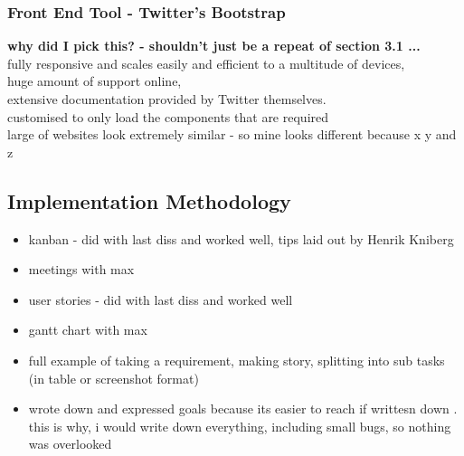\subsubsection{Front End Tool - Twitter's Bootstrap}
{\color{red} 
	\textbf{why did I pick this? - shouldn't just be a repeat of section 3.1 ...}\\
fully responsive and scales easily and efficient to a multitude of devices, \\
huge amount of support online, \\
extensive documentation provided by Twitter themselves. \\
customised to only load the components that are required\\
 large of websites look extremely similar - so mine looks different because x y and z
}

\subsection{Implementation Methodology}
{\color{red}
	\begin{itemize}
		\item kanban - did with last diss and worked well, tips laid out by Henrik Kniberg \cite{kniberg2007scrum}
		\item meetings with max
		\item user stories - did with last diss and worked well
		\item gantt chart with max
		\item 	full example of taking a requirement, making story, splitting into sub tasks (in table or screenshot format)
		\item wrote down and expressed goals because its easier to reach if writtesn down \cite{wilson2008goal}. this is why, i would write down everything, including small bugs, so nothing was overlooked
	\end{itemize}
}

